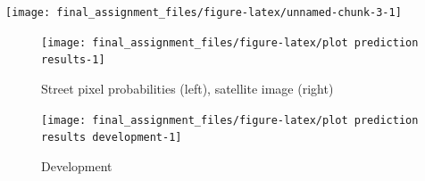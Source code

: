 \documentclass[
]{article}
\begin{document}
\begin{center}\texttt{[image: final\_assignment\_files/figure-latex/unnamed-chunk-3-1]} \end{center}

\begin{figure}

{\centering \texttt{[image: final\_assignment\_files/figure-latex/plot prediction results-1]} 

}

\caption{Street pixel probabilities (left), satellite image (right)}\label{fig:plot prediction results}
\end{figure}

\begin{figure}

{\centering \texttt{[image: final\_assignment\_files/figure-latex/plot prediction results development-1]} 

}

\caption{Development}\label{fig:plot prediction results development}
\end{figure}
\end{document}
